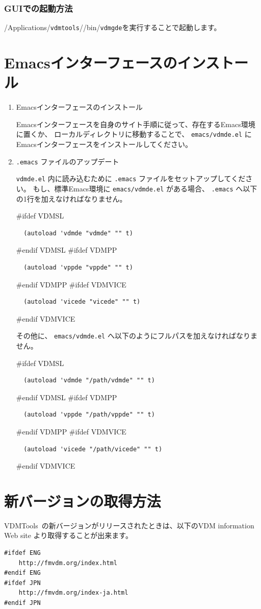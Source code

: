\documentclass[\pformat,12pt]{jarticle}
\newcommand{\Toolbox}{VDMTools}
\newcommand{\vdmgde}{vdmgde}
\newcommand{\vdmtools}{vdmtools}
\newcommand{\vdmdeNineteenEl}{vdmde.el}
\newcommand{\Toolbox}{VDMTools}
\newcommand{\vdmgde}{vppgde}
\newcommand{\vdmtools}{vdmtools}
\newcommand{\vdmdeNineteenEl}{vppde.el}
\newcommand{\Toolbox}{VDMTools}
\newcommand{\vdmgde}{vicegde}
\newcommand{\vdmtools}{vdmtools}
\newcommand{\vdmdeNineteenEl}{vicede.el}
\newcommand{\Index}[1]{#1\index{#1}}
\begin{document}
\subsubsection{GUIでの起動方法}
/Applications/{\tt \vdmtools}//bin/{\tt \vdmgde}を実行することで起動します。


\newpage
\section{Emacsインターフェースのインストール}
\label{sec:emacsinstall}

\begin{enumerate}
\item Emacsインターフェースのインストール
  
Emacsインターフェースを自身のサイト手順に従って、存在するEmacs環境に置くか、
ローカルディレクトリに移動することで、 {\tt emacs/\Index{\vdmdeNineteenEl}}
にEmacsインターフェースをインストールしてください。

\item  {\tt .emacs} ファイルのアップデート
  
{\tt \vdmdeNineteenEl} 内に読み込むために {\tt .emacs} ファイルをセットアップしてください。
もし、標準Emacs環境に {\tt emacs/\vdmdeNineteenEl} がある場合、 {\tt .emacs} へ以下の1行を加えなければなりません。

#ifdef VDMSL
\begin{verbatim}
  (autoload 'vdmde "vdmde" "" t)
\end{verbatim}
#endif VDMSL
#ifdef VDMPP
\begin{verbatim}
  (autoload 'vppde "vppde" "" t)
\end{verbatim}
#endif VDMPP
#ifdef VDMVICE
\begin{verbatim}
  (autoload 'vicede "vicede" "" t)
\end{verbatim}
#endif VDMVICE

その他に、 {\tt emacs/\vdmdeNineteenEl} へ以下のようにフルパスを加えなければなりません。

#ifdef VDMSL
\begin{verbatim}
  (autoload 'vdmde "/path/vdmde" "" t)
\end{verbatim}
#endif VDMSL
#ifdef VDMPP
\begin{verbatim}
  (autoload 'vppde "/path/vppde" "" t)
\end{verbatim}
#endif VDMPP
#ifdef VDMVICE
\begin{verbatim}
  (autoload 'vicede "/path/vicede" "" t)
\end{verbatim}
#endif VDMVICE
\end{enumerate}

\newpage
\section{新バージョンの取得方法}
\Toolbox\ の新バージョンがリリースされたときは、以下のVDM information \Index{Web site}
より取得することが出来ます。

\begin{verbatim}
#ifdef ENG
    http://fmvdm.org/index.html
#endif ENG
#ifdef JPN
    http://fmvdm.org/index-ja.html
#endif JPN
\end{verbatim}
\end{document}
